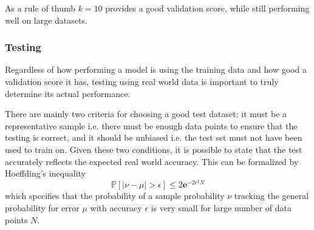 As a rule of thumb $k=10$ provides a good validation score, while still performing well on large datasets\cite{learningfromdata2012course}.

\subsubsection{Testing}
\label{ssub:Testing}
Regardless of how performing a model is using the training data and how good a validation score it has,
testing using real world data is important to truly determine its actual performance.

There are mainly two criteria for choosing a good test dataset: it must be a representative sample i.e. there must be enough data points to ensure that the testing is correct,
and it should be unbiased i.e. the test set must not have been used to train on.
Given these two conditions, it is possible to state that the test accurately reflects the expected real world accuracy.
This can be formalized by Hoeffding's inequality
$$\mathbb{P}\left[\left|\nu - \mu\right|> \epsilon\right]\leq 2\mathbf{e}^{-2\epsilon^2N}$$
which specifies that the probability of a sample probability $\nu$ tracking the general probability for error $\mu$ with accuracy $\epsilon$ is very small for large
number of data points $N$.
